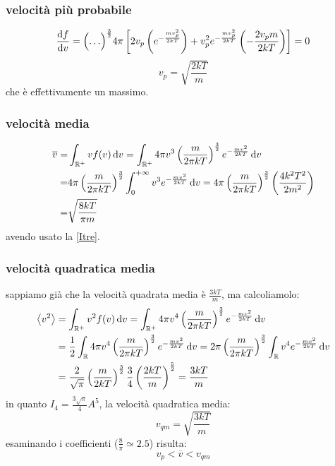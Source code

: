 \subsubsection{velocità più probabile}
\begin{equation}
	\frac{\mathrm{d} f}{\mathrm{d} v}
	=\Bigl(\ldots\Bigr)^{\frac{3}{2}}4\pi\left[2v_p\left(e^{-\frac{m v_p^2}{2kT}}\right)+v_p^2e^{-\frac{mv_p^2}{2kT}}\left(-\frac{2v_p m}{2kT}\right)\right]=0
\end{equation}
\begin{equation}
	v_p=\sqrt{\frac{2kT}{m}}
\end{equation}
che è effettivamente un massimo.
\subsubsection{velocità media}
\begin{equation}
	\begin{split}
		\overline{v}=&\int_{\mathbb{R}^+}vf(v)\,\mathrm{d} v=\int_{\mathbb{R}^+}4\pi v^3\left(\frac{m}{2\pi kT}\right)^{\frac{3}{2}}e^{-\frac{mv^2}{2kT}}\,\mathrm{d} v\\
		=&{4\pi}\left(\frac{m}{2\pi kT}\right)^{\frac{3}{2}}\int_0^{+\infty}v^3e^{-\frac{mv^2}{2kT}}\,\mathrm{d} v=4\pi\left(\frac{m}{2\pi kT}\right)^{\frac{3}{2}}\left(\frac{4k^2T^2}{2m^2}\right)\\
		=&\sqrt{\frac{8kT}{\pi m}}
	\end{split}
\end{equation}
avendo usato la \eqref{Itre}.
\subsubsection{velocità quadratica media}
sappiamo già che la velocità quadrata media è $\frac{3kT}{m}$, ma calcoliamolo:
\begin{equation}
	\begin{split}
		\left<v^2\right>&=\int_{\mathbb{R}^+} v^2f(v)\,\mathrm{d} v=\int_{\mathbb{R}^+}4\pi v^4\left(\frac{m}{2\pi kT}\right)^{\frac{3}{2}}e^{-\frac{mv^2}{2kT}}\,\mathrm{d} v\\
		&=\frac{1}{2}\int_{\mathbb{R}}4\pi v^4\left(\frac{m}{2\pi kT}\right)^{\frac{3}{2}}e^{-\frac{mv^2}{2kT}}\,\mathrm{d} v=
		2\pi\left(\frac{m}{2\pi kT}\right)^{\frac{3}{2}}\int_{\mathbb{R}}v^4e^{-\frac{mv^2}{2kT}}\,\mathrm{d} v\\
		&=\frac{2}{\sqrt{\pi}}\left(\frac{m}{2 kT}\right)^{\frac{3}{2}}\frac{3}{4}\left(\frac{2kT}{m}\right)^{\frac{5}{2}}=\frac{3kT}{m}
	\end{split}
\end{equation}
in quanto $I_4=\frac{3\sqrt{\pi}}4{A^5}$, la velocità quadratica media:
\begin{equation}
	v_{qm}=\sqrt{\frac{3kT}{m}}
\end{equation}
esaminando i coefficienti ($\frac{8}{\pi}\simeq 2.5$) risulta:
\begin{equation}
	v_p<\overline{v}<v_{qm}
\end{equation}
